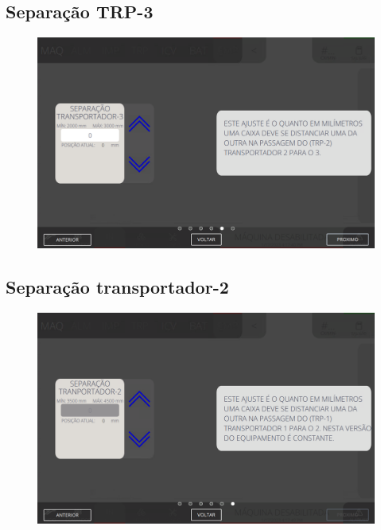 \newpage
\thispagestyle{fancy}
\vspace*{40 pt}
\subsection{\small Separação TRP-3}
\vspace*{\fill}
\begin{figure}[h]
    \centering
    \includegraphics[width=576 px,height=360 px]{src/imagesICV/08-stacker/settings/5.png}
\end{figure}
\vspace*{\fill}

\newpage
\thispagestyle{fancy}
\vspace*{40 pt}
\subsection{\small Separação transportador-2}
\vspace*{\fill}
\begin{figure}[h]
    \centering
    \includegraphics[width=576 px,height=360 px]{src/imagesICV/08-stacker/settings/6.png}
\end{figure}
\vspace*{\fill}
